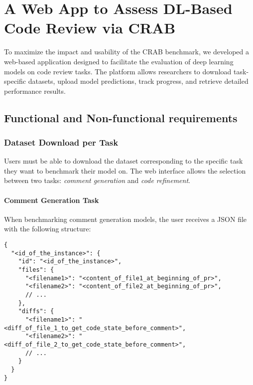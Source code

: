 \section{A Web App to Assess DL-Based Code Review via CRAB}
\label{sec:webapp}

To maximize the impact and usability of the CRAB benchmark, we developed a web-based application
designed to facilitate the evaluation of deep learning models on code review tasks. The platform
allows researchers to download task-specific datasets, upload model predictions, track progress, and
retrieve detailed performance results.

\subsection{Functional and Non-functional requirements}

%

\subsubsection{Dataset Download per Task}

Users must be able to download the dataset corresponding to the specific task they want to benchmark
their model on. The web interface allows the selection between two tasks: \emph{comment
	generation} and \emph{code refinement}.

\paragraph{Comment Generation Task}

When benchmarking comment generation models, the user receives a JSON file with the following
structure:

\begin{verbatim}
{
  "<id_of_the_instance>": {
    "id": "<id_of_the_instance>",
    "files": {
      "<filename1>": "<content_of_file1_at_beginning_of_pr>",
      "<filename2>": "<content_of_file2_at_beginning_of_pr>",
      // ...
    },
    "diffs": {
      "<filename1>": "<diff_of_file_1_to_get_code_state_before_comment>",
      "<filename2>": "<diff_of_file_2_to_get_code_state_before_comment>",
      // ...
    }
  }
}
\end{verbatim}

